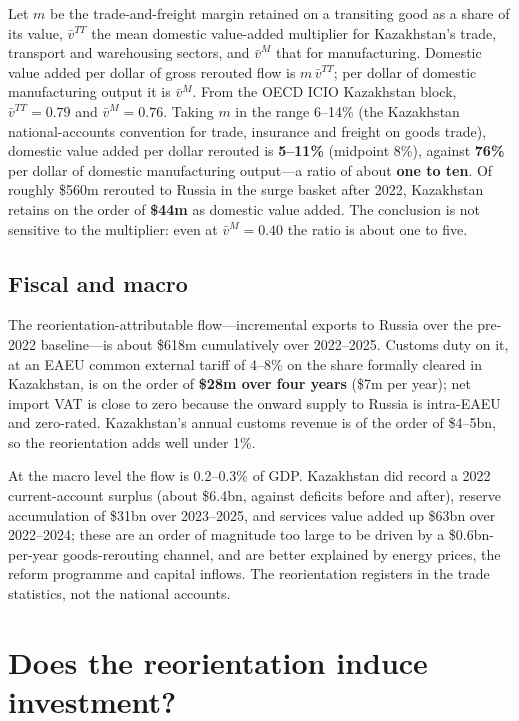 \documentclass[12pt]{article}
\begin{document}
Let $m$ be the trade-and-freight margin retained on a transiting good as a share of its value,
$\bar v^{TT}$ the mean domestic value-added multiplier for Kazakhstan's trade, transport and
warehousing sectors, and $\bar v^{M}$ that for manufacturing. Domestic value added per dollar
of gross rerouted flow is $m\,\bar v^{TT}$; per dollar of domestic manufacturing output it is
$\bar v^{M}$. From the OECD ICIO Kazakhstan block, $\bar v^{TT} = 0.79$ and $\bar v^{M} =
0.76$. Taking $m$ in the range 6--14\% (the Kazakhstan national-accounts convention for
trade, insurance and freight on goods trade), domestic value added per dollar rerouted is
\textbf{5--11\%} (midpoint 8\%), against \textbf{76\%} per dollar of domestic manufacturing
output---a ratio of about \textbf{one to ten}. Of roughly \$560m rerouted to Russia in the
surge basket after 2022, Kazakhstan retains on the order of \textbf{\$44m} as domestic value
added. The conclusion is not sensitive to the multiplier: even at $\bar v^{M}=0.40$ the ratio
is about one to five.

\subsection{Fiscal and macro}

The reorientation-attributable flow---incremental exports to Russia over the pre-2022
baseline---is about \$618m cumulatively over 2022--2025. Customs duty on it, at an EAEU common
external tariff of 4--8\% on the share formally cleared in Kazakhstan, is on the order of
\textbf{\$28m over four years} (\$7m per year); net import VAT is close to zero because the
onward supply to Russia is intra-EAEU and zero-rated. Kazakhstan's annual customs revenue is
of the order of \$4--5bn, so the reorientation adds well under 1\%.

At the macro level the flow is 0.2--0.3\% of GDP. Kazakhstan did record a 2022 current-account
surplus (about \$6.4bn, against deficits before and after), reserve accumulation of \$31bn
over 2023--2025, and services value added up \$63bn over 2022--2024; these are an order of
magnitude too large to be driven by a \$0.6bn-per-year goods-rerouting channel, and are
better explained by energy prices, the reform programme and capital inflows. The reorientation
registers in the trade statistics, not the national accounts.

\section{Does the reorientation induce investment?}
\end{document}

